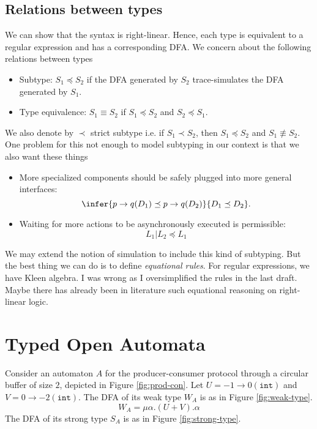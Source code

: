 \subsection{Relations between types}
We can show that the syntax is right-linear. Hence, each type is equivalent to a regular expression and has a corresponding DFA. We concern about the following relations between types

\begin{itemize}
  \item Subtype: $S_1\preceq S_2$ if the DFA generated by $S_2$ trace-simulates the DFA generated by $S_1$.
  \item Type equivalence: $S_1\equiv S_2$ if $S_1\preceq S_2$ and $S_2\preceq S_1$.
\end{itemize}

We also denote by $\prec$ strict subtype i.e. if $S_1\prec S_2$, then $S_1\preceq S_2$ and $S_1\not\equiv S_2$. One problem for this not enough to model subtyping in our context is that we also want these things

\begin{itemize}
  \item More specialized components should be safely plugged into more general interfaces: $$\infer{p\rightarrow q(D_1) \preceq p\rightarrow q(D_2)}{D_1\preceq D_2}.$$
  \item Waiting for more actions to be asynchronously executed is permissible:
        $$L_1|L_2 \preceq L_1$$
\end{itemize}

We may extend the notion of simulation to include this kind of subtyping. But the best thing we can do is to define \textit{equational rules}. For regular expressions, we have Kleen algebra. I was wrong as I oversimplified the rules in the last draft. Maybe there has already been in literature such equational reasoning on right-linear logic.

\section{Typed Open Automata}
\begin{example}
  Consider an automaton $A$ for the producer-consumer protocol through a circular buffer of size $2$, depicted in Figure \ref{fig:prod-con}. Let $U = -1\to 0 (\texttt{int})$ and $V = 0\to -2 (\texttt{int})$. The DFA of its weak type $W_A$ is as in Figure \ref{fig:weak-type}.
  \begin{equation}
    W_A=\mu\alpha.(U+V).\alpha
  \end{equation}
  The DFA of its strong type $S_A$ is as in Figure \ref{fig:strong-type}.
\end{example}

